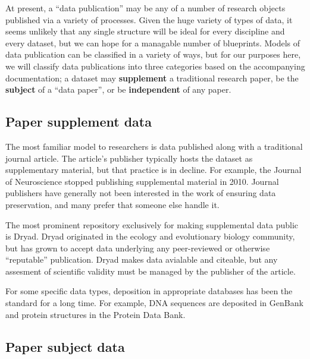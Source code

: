 \documentclass[10pt,a4paper,twocolumn]{article}
\begin{document}
At present, a ``data publication'' may be any of a number of research objects published via a variety of processes.
Given the huge variety of types of data, it seems unlikely that any single structure will be ideal for every discipline and every dataset, but we can hope for a managable number of blueprints. 
Models of data publication can be classified in a variety of ways, but for our purposes here, we will classify data publications into three categories based on the accompanying documentation; a dataset may \textbf{supplement} a traditional research paper, be the \textbf{subject} of a ``data paper'', or be \textbf{independent} of any paper.

\subsection*{Paper supplement data}\label{paper-supplement-data}

The most familiar model to researchers is data published along with a traditional journal article. 
The article's publisher typically hosts the dataset as supplementary material, but that practice is in decline.
For example, the Journal of Neuroscience stopped publishing supplemental material in 2010\cite{maunsell_announcement_2010}. 
Journal publishers have generally not been interested in the work of ensuring data preservation, and many prefer that someone else handle it.

The most prominent repository exclusively for making supplemental data public is Dryad\cite{dryad}.
Dryad originated in the ecology and evolutionary biology community, but has grown to accept data underlying any peer-reviewed or otherwise ``reputable'' publication. Dryad makes data avialable and citeable, but any assesment of scientific validity must be managed by the publisher of the article. 

For some specific data types, deposition in appropriate databases has been the standard for a long time. 
For example, DNA sequences are deposited in GenBank\cite{genbank} and protein structures in the Protein Data Bank\cite{protein_data_bank}.


\subsection*{Paper subject data}\label{paper-subject-data}
\end{document}
